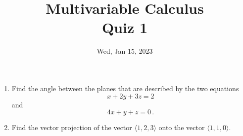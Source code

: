 \documentclass[aspectratio=169]{beamer}
\title{ Multivariable Calculus \\ Quiz 1}
\institute{Fulbright University Vietnam}
\date{Wed, Jan 15, 2023}
\begin{document}
\maketitle

\begin{frame}
	\begin{enumerate}
		\item Find the angle between the planes that are described by the two equations
		      \begin{equation*}
			      x + 2y + 3z = 2
		      \end{equation*}
		      and
		      \begin{equation*}
			      4x + y + z = 0 \,.
		      \end{equation*}

		\item Find the vector projection of the vector $\langle 1,2,3 \rangle$
		      onto the vector $\langle 1,1, 0 \rangle$.
	\end{enumerate}
\end{frame}
\end{document}

